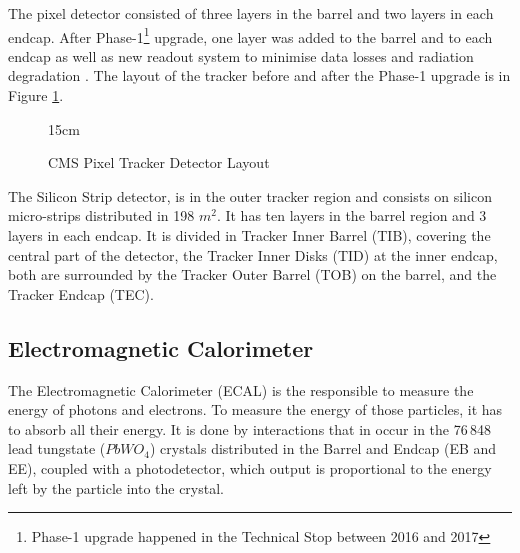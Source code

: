 The pixel detector consisted of three layers in the barrel and two layers in each endcap. After Phase-1\footnote{Phase-1 upgrade happened in the Technical Stop between 2016 and 2017} upgrade, one layer was added to the barrel and to each endcap as well as new readout system to minimise data losses and radiation degradation \cite{Dominguez:1481838}. The layout of the tracker before and after the Phase-1 upgrade is in Figure \ref{fig:pixel_layout}.

\begin{figure}[!htm]{15cm} %
\caption{CMS Pixel Tracker Detector Layout}%
\label{fig:pixel_layout}
\end{figure}

The Silicon Strip detector, is in the outer tracker region and consists on silicon micro-strips distributed in 198 $m^2$. It has ten layers in the barrel region and 3 layers in each endcap. It is divided in Tracker Inner Barrel (TIB), covering the central part of the detector, the Tracker Inner Disks (TID) at the inner endcap, both are surrounded by the Tracker Outer Barrel (TOB) on the barrel, and the Tracker Endcap (TEC).

\subsection{Electromagnetic Calorimeter}

The Electromagnetic Calorimeter (ECAL) is the responsible to measure the energy of photons and electrons. To measure the energy of those particles, it has to absorb all their energy. It is done by interactions that in occur in the 76\,848 lead tungstate ($PbWO_4$) crystals distributed in the Barrel and Endcap (EB and EE), coupled with a photodetector, which output is proportional to the energy left by the particle into the crystal. 

